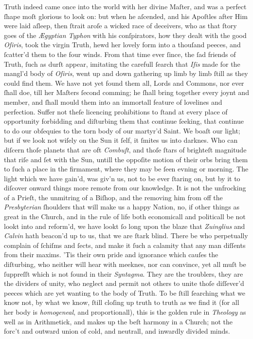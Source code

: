 Truth indeed came once into the world with her divine Maſter, and was a perfect
ſhape moſt glorious to look on: but when he aſcended, and his Apoſtles after Him
were laid aſleep, then ſtrait aroſe a wicked race of deceivers, who as that
ſtory goes of the \textit{Ægyptian Typhon} with his conſpirators, how they dealt
with the good \textit{Oſiris}, took the virgin Truth, hewd her lovely form into
a thouſand peeces, and ſcatter'd them to the four winds.  From that time ever
ſince, the ſad friends of Truth, ſuch as durſt appear, imitating the carefull
ſearch that \textit{Iſis} made for the mangl'd body of \textit{Oſiris}, went up
and down gathering up limb by limb ſtill as they could find them.  We have not
yet found them all, Lords and Commons, nor ever ſhall doe, till her Maſters
ſecond comming; he ſhall bring together every joynt and member, and ſhall mould
them into an immortall feature of lovelines and perfection.  Suffer not theſe
licencing prohibitions to ſtand at every place of opportunity forbidding and
diſturbing them that continue ſeeking, that continue to do our obſequies to the
torn body of our martyr'd Saint.  We boaſt our light; but if we look not wiſely
on the Sun it ſelf, it ſmites us into darknes.  Who can diſcern thoſe planets
that are oft \textit{Combuſt}, and thoſe ſtars of brighteſt magnitude that riſe
and ſet with the Sun, untill the oppoſite motion of their orbs bring them to
ſuch a place in the firmament, where they may be ſeen evning or morning.  The
light which we have gain'd, was giv'n us, not to be ever ſtaring on, but by it
to diſcover onward things more remote from our knowledge.  It is not the
unfrocking of a Prieſt, the unmitring of a Biſhop, and the removing him from off
the \textit{Presbyterian} ſhoulders that will make us a happy Nation, no, if
other things as great in the Church, and in the rule of life both economicall
and politicall be not lookt into and reform'd, we have lookt ſo long upon the
blaze that \textit{Zuinglius} and \textit{Calvin} hath beacon'd up to us, that
we are ſtark blind.  There be who perpetually complain of ſchiſms and ſects, and
make it ſuch a calamity that any man diſſents from their maxims.  'Tis their own
pride and ignorance which cauſes the diſturbing, who neither will hear with
meeknes, nor can convince, yet all muſt be ſuppreſſt which is not found in their
\textit{Syntagma}.  They are the troublers, they are the dividers of unity, who
neglect and permit not others to unite thoſe diſſever'd peeces which are yet
wanting to the body of Truth.  To be ſtill ſearching what we know not, by what
we know, ſtill cloſing up truth to truth as we find it (for all her body is
\textit{homogeneal}, and proportionall), this is the golden rule in
\textit{Theology} as well as in Arithmetick, and makes up the beſt harmony in a
Church; not the forc't and outward union of cold, and neutrall, and inwardly
divided minds.

